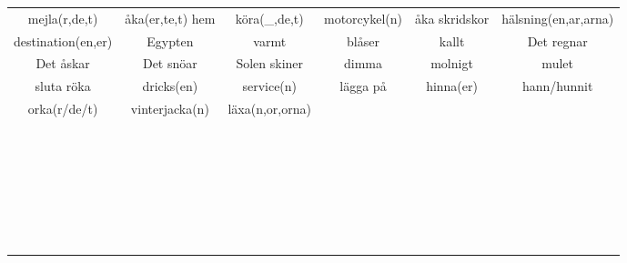 \begin{center}
\begin{adjustwidth}{-2.4cm}{}
\begin{tabular}{|c c c c c c|}
            mejla(r,de,t) & åka(er,te,t) hem & köra(\_,de,t) & motorcykel(n) & åka skridskor & hälsning(en,ar,arna) \\
            destination(en,er) & Egypten & varmt & blåser & kallt & Det regnar \\
            Det åskar & Det snöar & Solen skiner & dimma & molnigt & mulet \\
            sluta röka & dricks(en) & service(n) & lägga på & hinna(er) & hann/hunnit \\
            orka(r/de/t) & vinterjacka(n) & läxa(n,or,orna) &  &  &  \\
             &  &  &  &  &  \\
             &  &  &  &  &  \\
             &  &  &  &  &  \\
             &  &  &  &  &  \\
             &  &  &  &  &  \\
             &  &  &  &  &  \\
             &  &  &  &  &  \\
             &  &  &  &  &  \\
             &  &  &  &  &  \\
             &  &  &  &  &  \\
             &  &  &  &  &  \\
             &  &  &  &  &  \\
             &  &  &  &  &  \\
             &  &  &  &  &  \\
             &  &  &  &  &  \\
             &  &  &  &  &  \\
             &  &  &  &  &  \\
             &  &  &  &  &  \\
             &  &  &  &  &  \\
             &  &  &  &  &  \\
             &  &  &  &  &  \\
             &  &  &  &  &  \\
             &  &  &  &  &  \\
             &  &  &  &  &  \\
             &  &  &  &  &  \\
             &  &  &  &  &  \\
             &  &  &  &  &  \\
             &  &  &  &  &  \\
            \hline
        \end{tabular}
    \end{adjustwidth}
\end{center}

